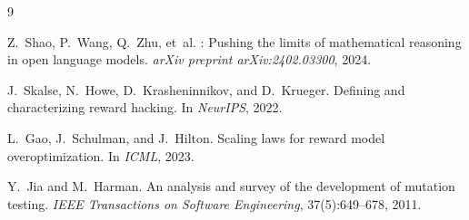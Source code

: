 \documentclass[11pt,a4paper]{article}
\begin{document}

\begin{thebibliography}{9}

Z.~Shao, P.~Wang, Q.~Zhu, et~al.
: Pushing the limits of mathematical reasoning in open language models.
\newblock \emph{arXiv preprint arXiv:2402.03300}, 2024.

J.~Skalse, N.~Howe, D.~Krasheninnikov, and D.~Krueger.
\newblock Defining and characterizing reward hacking.
\newblock In \emph{NeurIPS}, 2022.

L.~Gao, J.~Schulman, and J.~Hilton.
\newblock Scaling laws for reward model overoptimization.
\newblock In \emph{ICML}, 2023.

Y.~Jia and M.~Harman.
\newblock An analysis and survey of the development of mutation testing.
\newblock \emph{IEEE Transactions on Software Engineering}, 37(5):649--678, 2011.

\end{thebibliography}
\end{document}
